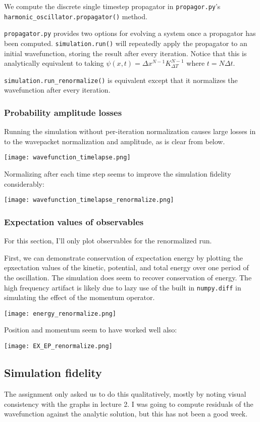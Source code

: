 \documentclass[12pt]{article}
\begin{document}
We compute the discrete single timestep propagator in \texttt{propagor.py}'s \newline \texttt{harmonic\_oscillator.propagator()} method.

\texttt{propagator.py} provides two options for evolving a system once a propagator has been computed. \texttt{simulation.run()} will repeatedly apply the propagator to an initial wavefunction, storing the result after every iteration. Notice that this is analytically equivalent to taking \(\psi(x,t) = \Delta x^{N-1}K_{\Delta T}^{N-1}\) where \(t = N\Delta t\).

\texttt{simulation.run\_renormalize()} is equivalent except that it normalizes the wavefunction after every iteration.

\subsubsection*{Probability amplitude losses}

Running the simulation without per-iteration normalization causes large losses in to the wavepacket normalization and amplitude, as is clear from below.

\texttt{[image: wavefunction\_timelapse.png]}

Normalizing after each time step seems to improve the simulation fidelity considerably:

\texttt{[image: wavefunction\_timelapse\_renormalize.png]}

\subsubsection*{Expectation values of observables}

For this section, I'll only plot observables for the renormalized run. 

First, we can demonstrate conservation of expectation energy by plotting the epxectation values of the kinetic, potential, and total energy over one period of the oscillation. The simulation does seem to recover conservation of energy. The high frequency artifact is likely due to lazy use of the built in \texttt{numpy.diff} in simulating the effect of the momentum operator.

\texttt{[image: energy\_renormalize.png]}

Position and momentum seem to have worked well also:

\texttt{[image: EX\_EP\_renormalize.png]}

\subsection*{Simulation fidelity}

The assignment only asked us to do this qualitatively, mostly by noting visual consistency with the graphs in lecture 2. I was going to compute residuals of the wavefunction against the analytic solution, but this has not been a good week.
 
\end{document}

